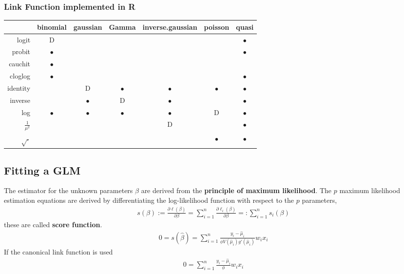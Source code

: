 \subsubsection{Link Function implemented in R}
\renewcommand{\arraystretch}{1.0}
\small{
\begin{tabular}{r | c c c c c c}
                  & binomial         & gaussian  & Gamma
                  & inverse.gaussian & poisson   & quasi     \\\hline
logit             & D                &           &
                  &                  &           & $\bullet$ \\
probit            & $\bullet$        &           &
                  &                  &           & $\bullet$ \\
cauchit           & $\bullet$        &           &
                  &                  &           &           \\
cloglog           & $\bullet$        &           &
                  &                  &           & $\bullet$ \\
identity          &                  & D         & $\bullet$
                  & $\bullet$        & $\bullet$ & $\bullet$ \\
inverse           &                  & $\bullet$ & D
                  & $\bullet$        &           & $\bullet$ \\
log               & $\bullet$        & $\bullet$ & $\bullet$
                  & $\bullet$        & D         & $\bullet$ \\
$\frac{1}{\mu^2}$ &                  &           &
                  & D                &           & $\bullet$ \\
$\sqrt{.}$        &                  &           &
                  &                  & $\bullet$ & $\bullet$

\end{tabular}
}
\renewcommand{\arraystretch}{\arraystretchOriginal}

\subsection{Fitting a GLM}
The estimator for the unknown parameters $\beta$ are derived from the
\textbf{principle of maximum likelihood}.
The $p$ maximum likelihood estimation equations are derived by differentiating
the log-likelihood function with respect to the $p$ parameters,
\begin{align*}
s(\beta)
:=
\frac{\partial \ell(\beta)}{\partial \beta}
=
\sum_{i=1}^n \frac{\partial \ell_i(\beta)}{\partial \beta}
=:
\sum_{i=1}^n s_i(\beta)
\end{align*}
these are called \textbf{score function}.
\begin{align*}
0
=
s(\widehat{\beta})
=
\sum_{i=1}^n \frac{y_i - \widehat\mu_i}{\phi V(\widehat\mu_i)
g'(\widehat\mu_i)} w_i x_i
\end{align*}
If the canonical link function is used
\begin{align*}
0
=
\sum_{i=1}^n \frac{y_i - \widehat\mu_i}{\phi} w_i x_i
\end{align*}

